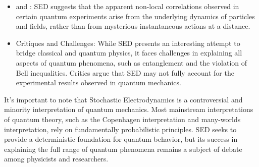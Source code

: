 \begin{itemize}
	\item {} and : SED suggests that the apparent non-local correlations observed in certain quantum experiments arise from the underlying dynamics of particles and fields, rather than from mysterious instantaneous actions at a distance.

	\item Critiques and Challenges: While SED presents an interesting attempt to bridge classical and quantum physics, it faces challenges in explaining all aspects of quantum phenomena, such as entanglement and the violation of Bell inequalities. Critics argue that SED may not fully account for the experimental results observed in quantum mechanics.
\end{itemize}

It's important to note that Stochastic Electrodynamics is a controversial and minority interpretation of quantum mechanics. Most mainstream interpretations of quantum theory, such as the Copenhagen interpretation and many-worlds interpretation, rely on fundamentally probabilistic principles. SED seeks to provide a deterministic foundation for quantum behavior, but its success in explaining the full range of quantum phenomena remains a subject of debate among physicists and researchers.
